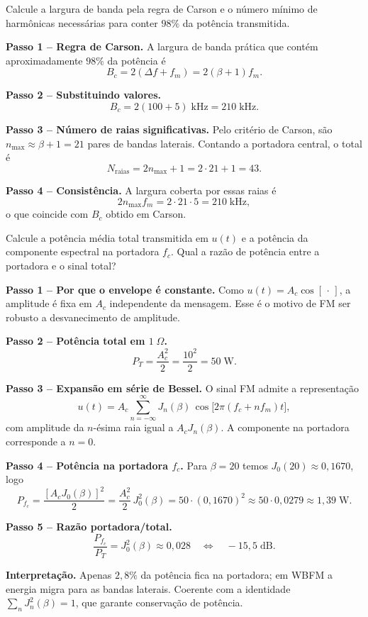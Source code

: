 \documentclass[11pt,a4paper]{article}
\begin{document}
\begin{enunciado}[Item c)]
Calcule a largura de banda pela regra de Carson e o número mínimo de harmônicas necessárias para conter $98\%$ da potência transmitida.
\end{enunciado}

\begin{resolucao}

\textbf{Passo 1 -- Regra de Carson.} A largura de banda prática que contém aproximadamente $98\%$ da potência é
\[
  B_c = 2(\Delta f + f_m) = 2(\beta + 1) f_m.
\]

\textbf{Passo 2 -- Substituindo valores.}
\[
  B_c = 2(100 + 5)\;\text{kHz} = \boxed{210\;\text{kHz}.}
\]

\textbf{Passo 3 -- Número de raias significativas.} Pelo critério de Carson, são $n_{\max} \approx \beta + 1 = 21$ pares de bandas laterais. Contando a portadora central, o total é
\[
  N_{\text{raias}} = 2 n_{\max} + 1 = 2 \cdot 21 + 1 = 43.
\]

\textbf{Passo 4 -- Consistência.} A largura coberta por essas raias é
\[
  2 n_{\max} f_m = 2 \cdot 21 \cdot 5 = 210\;\text{kHz},
\]
o que coincide com $B_c$ obtido em Carson.
\end{resolucao}

\begin{enunciado}[Item d)]
Calcule a potência média total transmitida em $u(t)$ e a potência da componente espectral na portadora $f_c$. Qual a razão de potência entre a portadora e o sinal total?
\end{enunciado}

\begin{resolucao}

\textbf{Passo 1 -- Por que o envelope é constante.} Como $u(t) = A_c\cos[\,\cdot\,]$, a amplitude é fixa em $A_c$ independente da mensagem. Esse é o motivo de FM ser robusto a desvanecimento de amplitude.

\textbf{Passo 2 -- Potência total em $1\;\Omega$.}
\[
  P_T = \frac{A_c^2}{2} = \frac{10^2}{2} = \boxed{50\;\text{W}.}
\]

\textbf{Passo 3 -- Expansão em série de Bessel.} O sinal FM admite a representação
\[
  u(t) = A_c \sum_{n=-\infty}^{\infty} J_n(\beta)\,\cos\!\big[2\pi(f_c + n f_m)t\big],
\]
com amplitude da $n$-ésima raia igual a $A_c J_n(\beta)$. A componente na portadora corresponde a $n = 0$.

\textbf{Passo 4 -- Potência na portadora $f_c$.} Para $\beta = 20$ temos $J_0(20) \approx 0{,}1670$, logo
\[
  P_{f_c} = \frac{[A_c J_0(\beta)]^2}{2} = \frac{A_c^2}{2}\, J_0^2(\beta) = 50 \cdot (0{,}1670)^2 \approx 50 \cdot 0{,}0279 \approx 1{,}39\;\text{W}.
\]

\textbf{Passo 5 -- Razão portadora/total.}
\[
  \frac{P_{f_c}}{P_T} = J_0^2(\beta) \approx 0{,}028 \quad \Leftrightarrow \quad -15{,}5\;\text{dB}.
\]

\textbf{Interpretação.} Apenas $2{,}8\%$ da potência fica na portadora; em WBFM a energia migra para as bandas laterais. Coerente com a identidade $\sum_n J_n^2(\beta) = 1$, que garante conservação de potência.
\end{resolucao}
\end{document}

